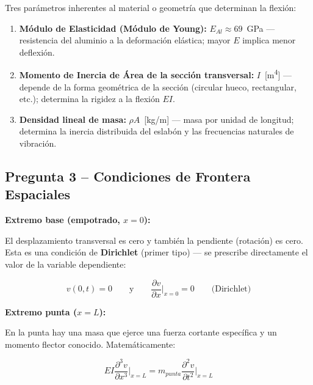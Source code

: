 \documentclass[12pt,a4paper]{article}
\begin{document}
\noindent Tres parámetros inherentes al material o geometría que determinan la flexión:

\begin{enumerate}
    \item \textbf{Módulo de Elasticidad (Módulo de Young):} $E_{Al} \approx 69$~GPa --- resistencia
          del aluminio a la deformación elástica; mayor $E$ implica menor deflexión.
    \item \textbf{Momento de Inercia de Área de la sección transversal:} $I$~[m\textsuperscript{4}]
          --- depende de la forma geométrica de la sección (circular hueco, rectangular, etc.);
          determina la rigidez a la flexión $EI$.
    \item \textbf{Densidad lineal de masa:} $\rho A$~[kg/m] --- masa por unidad de longitud;
          determina la inercia distribuida del eslabón y las frecuencias naturales de vibración.
\end{enumerate}

\subsection*{Pregunta 3 -- Condiciones de Frontera Espaciales}

\noindent\textbf{Extremo base (empotrado, $x = 0$):}

El desplazamiento transversal es cero y también la pendiente (rotación) es cero. Esta es una
condición de \textbf{Dirichlet} (primer tipo) --- se prescribe directamente el valor de la
variable dependiente:

\begin{equation}
    v(0,t) = 0 \qquad \text{y} \qquad
    \frac{\partial v}{\partial x}\bigg|_{x=0} = 0 \qquad \text{(Dirichlet)}
\end{equation}

\noindent\textbf{Extremo punta ($x = L$):}

En la punta hay una masa que ejerce una fuerza cortante específica y un momento flector conocido.
Matemáticamente:

\begin{equation}
    EI\frac{\partial^3 v}{\partial x^3}\bigg|_{x=L} = m_{punta}\frac{\partial^2 v}{\partial t^2}
    \bigg|_{x=L}
\end{equation}
\end{document}
